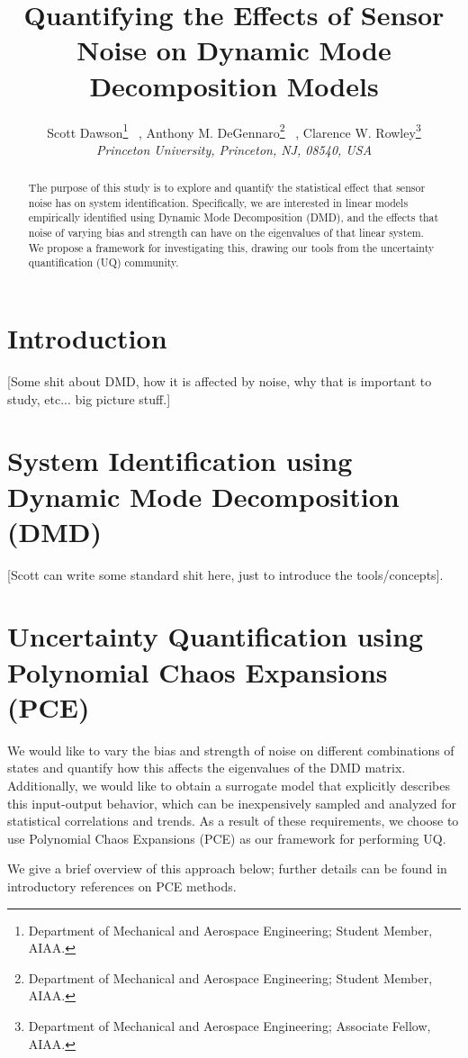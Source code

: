 \documentclass{aiaa-tc}%
\title{Quantifying the Effects of Sensor Noise on Dynamic Mode Decomposition Models}
\author{%
  Scott Dawson\thanks{Department of Mechanical and Aerospace
    Engineering; Student Member, AIAA.}
  \ ,
  Anthony M. DeGennaro\thanks{Department of Mechanical and Aerospace
    Engineering; Student Member, AIAA.}
  \ ,
  Clarence W. Rowley\thanks{Department of Mechanical and Aerospace Engineering;
    Associate Fellow, AIAA.}\\
  {\normalsize\itshape
   Princeton University, Princeton, NJ, 08540, USA}\\
 }
\begin{document}
\maketitle

\begin{abstract}
  The purpose of this study is to explore and quantify the statistical
  effect that sensor noise has on system identification. Specifically,
  we are interested in linear models empirically identified using
  Dynamic Mode Decomposition (DMD), and the effects that noise of
  varying bias and strength can have on the eigenvalues of that linear
  system. We propose a framework for investigating this, drawing our
  tools from the uncertainty quantification (UQ) community.

\end{abstract}

\section{Introduction}

[Some shit about DMD, how it is affected by noise, why that is
  important to study, etc... big picture stuff.]

\section{System Identification using Dynamic Mode Decomposition (DMD)}

[Scott can write some standard shit here, just to introduce the
  tools/concepts].

\section{Uncertainty Quantification using Polynomial Chaos Expansions (PCE)}

We would like to vary the bias and strength of noise on different
combinations of states and quantify how this affects the eigenvalues
of the DMD matrix. Additionally, we would like to obtain a surrogate
model that explicitly describes this input-output behavior, which can
be inexpensively sampled and analyzed for statistical correlations and
trends. As a result of these requirements, we choose to use Polynomial
Chaos Expansions (PCE) as our framework for performing UQ.

We give a brief overview of this approach below; further details can
be found in introductory references on PCE
methods\cite{ghanem_book,xiu_book,lemaitre}.
\end{document}
